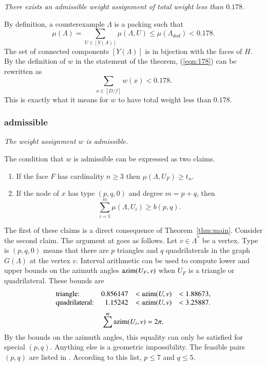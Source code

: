 {\it There exists an admissible weight assignment of total weight less than $0.178$.}

By definition, a counterexample $\Lambda$ is a packing such that
\begin{equation}\label{eqn:178}
\mu(\Lambda)=\sum_{U\in [Y(\Lambda)]} \mu(\Lambda,U) \le \mu(\Lambda_{dod}) < 0.178.
\end{equation}
The set of connected components $[Y(\Lambda)]$ is in bijection with the faces of $H$.
By the definition of $w$ in the statement of the theorem, (\ref{eqn:178}) can
be rewritten as
$$
\sum_{x\in[D/f]} w(x) < 0.178.
$$
This is exactly what it means for $w$ to have total weight less than $0.178$.

\subsubsection{admissible}\label{sec:pq}

{\it The weight assignment $w$ is admissible.}

The condition that $w$ is admissible can  be expressed as two claims.
\begin{enumerate}
\item If the face $F$  has cardinality $n\ge3$ then $\mu(\Lambda,U_F)\ge t_n$.
\item If the node of $x$ has type $(p,q,0)$ and degree $m=p+q$, then
  \begin{equation}\label{eqn:pq}
  \sum_{i=1}^m \mu(\Lambda,U_i) \ge b(p,q).
  \end{equation}
\end{enumerate}

The first of these claims is a direct consequence of Theorem~\ref{thm:main}.
Consider the second claim.  
The argument at \cite[p.14]{arx} goes as follows.
Let $v\in\Lambda^*$ be a vertex.
Type is $(p,q,0)$ means that there are $p$ triangles and $q$ quadrilaterals
in the graph $G(\Lambda)$ at the vertex $v$.
Interval arithmetic can be used to compute lower and upper bounds on the
azimuth angles ${\operatorname{azim}}(U_F,v)$ when $U_F$ is a triangle or quadrilateral.
These bounds are \cite[F.2.1,F.4]{arx}
$$
\begin{array}{lrlll}
\text{triangle:} &  0.856147 &< {\operatorname{azim}}(U,v) &< 1.88673,\\
\text{quadrilateral:} & 1.15242 &< {\operatorname{azim}}(U,v) &< 3.25887.\\
\end{array}
$$
\begin{equation}\label{eqn:2pi}
\sum^m {\operatorname{azim}}(U_i,v) = 2\pi.
\end{equation}
By the bounds on the azimuth angles, this equality can only be satisfied for
special $(p,q)$. Anything else is a geometric impossibility.  The feasible pairs $(p,q)$
are listed in \cite[Lemma~6.1]{arx}.  According to this list, $p\le 7$ and $q\le 5$.

